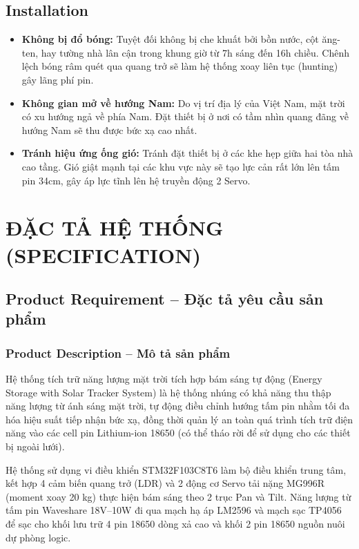 \documentclass[12pt,a4paper]{report}
\begin{document}
\section{Installation}
\begin{itemize}[leftmargin=1.5em,itemsep=3pt]
  \item \textbf{Không bị đổ bóng: }Tuyệt đối không bị che khuất bởi bồn nước, cột ăng-ten, hay tường nhà lân cận trong khung giờ từ 7h sáng đến 16h chiều. Chênh lệch bóng râm quét qua quang trở sẽ làm hệ thống xoay liên tục (hunting) gây lãng phí pin.
  \item \textbf{Không gian mở về hướng Nam: }Do vị trí địa lý của Việt Nam, mặt trời có xu hướng ngả về phía Nam. Đặt thiết bị ở nơi có tầm nhìn quang đãng về hướng Nam sẽ thu được bức xạ cao nhất.
  \item \textbf{Tránh hiệu ứng ống gió: }Tránh đặt thiết bị ở các khe hẹp giữa hai tòa nhà cao tầng. Gió giật mạnh tại các khu vực này sẽ tạo lực cản rất lớn lên tấm pin 34cm, gây áp lực tĩnh lên hệ truyền động 2 Servo.
\end{itemize}

\chapter{ĐẶC TẢ HỆ THỐNG (SPECIFICATION)}

\section{Product Requirement -- Đặc tả yêu cầu sản phẩm}

\subsection{Product Description -- Mô tả sản phẩm}

Hệ thống tích trữ năng lượng mặt trời tích hợp bám sáng tự động (Energy Storage with Solar Tracker System) là hệ thống nhúng có khả năng thu thập năng lượng từ ánh sáng mặt trời, tự động điều chỉnh hướng tấm pin nhằm tối đa hóa hiệu suất tiếp nhận bức xạ, đồng thời quản lý an toàn quá trình tích trữ điện năng vào các cell pin Lithium-ion 18650 (có thể tháo rời để sử dụng cho các thiết bị ngoài lưới).

Hệ thống sử dụng vi điều khiển STM32F103C8T6 làm bộ điều khiển trung tâm, kết hợp 4 cảm biến quang trở (LDR) và 2 động cơ Servo tải nặng MG996R (moment xoay 20 kg) thực hiện bám sáng theo 2 trục Pan và Tilt. Năng lượng từ tấm pin Waveshare 18V--10W đi qua mạch hạ áp LM2596 và mạch sạc TP4056 để sạc cho khối lưu trữ 4 pin 18650 dòng xả cao và khối 2 pin 18650 nguồn nuôi dự phòng logic.
\end{document}
